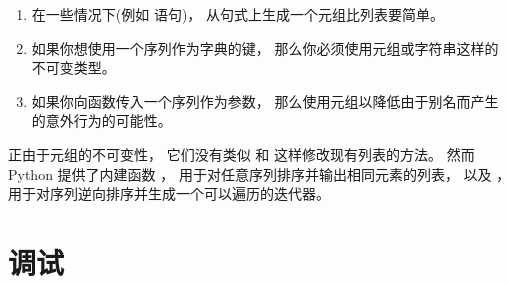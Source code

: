 {\begin{enumerate}

\item 在一些情况下(例如 语句)， 从句式上生成一个元组比列表要简单。

\item 如果你想使用一个序列作为字典的键， 那么你必须使用元组或字符串这样的不可变类型。

\item 如果你向函数传入一个序列作为参数， 那么使用元组以降低由于别名而产生的意外行为的可能性。

\end{enumerate}


正由于元组的不可变性， 它们没有类似  和  这样修改现有列表的方法。
然而 Python 提供了内建函数  ， 用于对任意序列排序并输出相同元素的列表， 以及  ， 用于对序列逆向排序并生成一个可以遍历的迭代器。

  
 


\section{调试}
 
 


}
